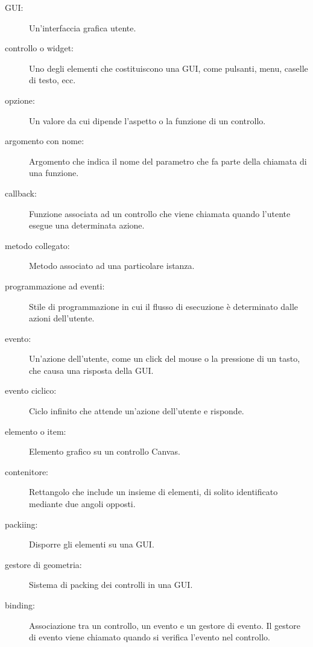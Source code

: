 \documentclass[10pt]{book}
\begin{document}
\begin{description}

\item[GUI:] Un'interfaccia grafica utente.

\item[controllo o widget:] Uno degli elementi che costituiscono una GUI, come pulsanti, menu, caselle di testo, ecc. 

\item[opzione:] Un valore da cui dipende l'aspetto o la funzione di un controllo.

\item[argomento con nome:] Argomento che indica il nome del parametro che fa parte della chiamata di una funzione.

\item[callback:] Funzione associata ad un controllo che viene chiamata quando l'utente esegue una determinata azione. 

\item[metodo collegato:] Metodo associato ad una particolare istanza.

\item[programmazione ad eventi:] Stile di programmazione in cui il flusso di esecuzione è determinato dalle azioni dell'utente.

\item[evento:] Un'azione dell'utente, come un click del mouse o la pressione di un tasto, che causa una risposta della GUI.

\item[evento ciclico:] Ciclo infinito che attende un'azione dell'utente e risponde.

\item[elemento o item:] Elemento grafico su un controllo Canvas.

\item[contenitore:] Rettangolo che include un insieme di elementi, di solito identificato mediante due angoli opposti.

\item[packiing:] Disporre gli elementi su una GUI.

\item[gestore di geometria:] Sistema di packing dei controlli in una GUI.

\item[binding:] Associazione tra un controllo, un evento e un gestore di evento. Il gestore di evento viene chiamato quando si verifica l'evento nel controllo.

\end{description}
\end{document}
